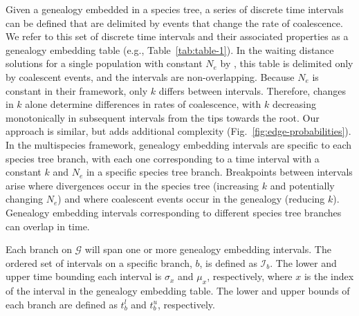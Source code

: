 \documentclass[11pt]{article}
\begin{document}
Given a genealogy embedded in a species tree, a series of discrete
time intervals can be defined that are delimited 
by events that change the rate of coalescence. 
We refer to this 
set of discrete time intervals and their associated properties
as a genealogy embedding table (e.g., Table~\ref{tab:table-1}). 
In the waiting distance solutions for a single population with constant $N_e$ 
by \citet{deng_distribution_2021}, this table is delimited only by coalescent 
events, and the intervals are non-overlapping. 
Because $N_e$ is constant in their framework, only $k$ differs between 
intervals. Therefore, changes in $k$ alone determine differences in rates of coalescence, 
with $k$ decreasing monotonically in subsequent intervals from the tips towards the root. 
Our approach is similar, but adds additional complexity (Fig.~\ref{fig:edge-probabilities}). 
In the multispecies framework, genealogy embedding intervals are specific to each 
species tree branch, with each one corresponding to a time interval with a constant 
$k$ and $N_e$ in a specific species tree branch. 
Breakpoints between intervals arise where divergences 
occur in the species tree (increasing $k$ and potentially changing $N_e$) 
and where coalescent events occur in the genealogy (reducing $k$). 
Genealogy embedding intervals corresponding to different species tree 
branches can overlap in time.

Each branch on $\mathcal{G}$ will span one or more genealogy embedding 
intervals. The ordered set of intervals on a specific branch, $b$, is 
defined as $\mathcal{I}_b$. The lower and upper time bounding each interval is 
$\sigma_x$ and $\mu_x$, respectively, where $x$ is the index of the 
interval in the genealogy embedding table. The lower and upper bounds of
each branch are defined as $t_b^l$ and $t_b^u$, respectively. 


\end{document}
